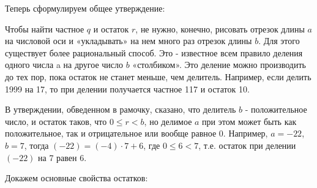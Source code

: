 Теперь сформулируем общее утверждение:


Чтобы найти частное $q$ и остаток $r$, не нужно, конечно, рисовать отрезок длины $a$ на числовой оси и «укладывать» на нем много раз отрезок длины $b$. Для этого существует более рациональный способ. Это - известное всем правило деления одного числа a на другое число $b$ «столбиком». Это деление можно производить до тех пор, пока остаток не станет меньше, чем делитель. Например, если делить 1999 на 17, то при делении получается частное 117 и остаток 10.

\begin{prim}
В утверждении, обведенном в рамочку, сказано, что делитель $b$ - положительное число, и остаток таков, что $0  \leqslant r < b$, но делимое $a$ при этом может быть как положительное, так и отрицательное или вообще равное $0$. Например, $a = -22$, $b = 7$, тогда   $(-22) = (-4)\cdot 7 + 6$, где $0 \leqslant 6 <7$, т.е. остаток при делении $(-22)$ на 7 равен 6.
\end{prim}


\newpage
Докажем основные свойства остатков:



